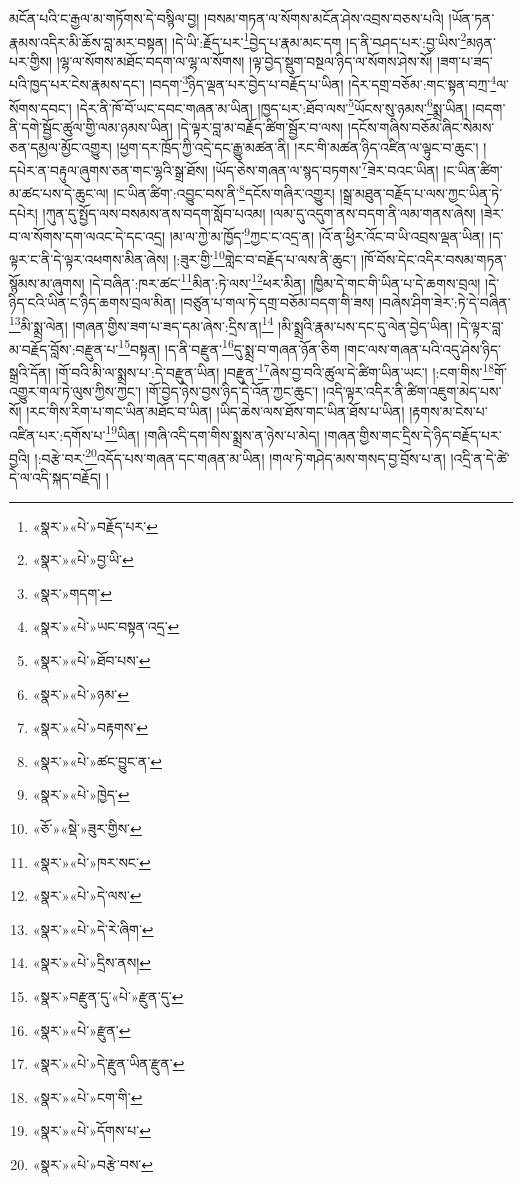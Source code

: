 མངོན་པའི་ང་རྒྱལ་མ་གཏོགས་དེ་བསྙིལ་བྱ། །བསམ་གཏན་ལ་སོགས་མངོན་ཤེས་འབྲས་བཅས་པའི། །ཡོན་ཏན་རྣམས་འདིར་མི་ཆོས་བླ་མར་བསྟན། །དེ་ཡི་:རྗོད་པར་\footnote{«སྣར་»«པེ་»བརྗོད་པར་}བྱེད་པ་རྣམ་མང་དག །ད་ནི་བཤད་པར་:བྱ་ཡིས་\footnote{«སྣར་»«པེ་»བྱ་ཡི་}མཉན་པར་གྱིས། །ལྷ་ལ་སོགས་མཐོང་བདག་ལ་ལྷ་ལ་སོགས། །ལྟ་བྱེད་སྡུག་བསྔལ་ཉིད་ལ་སོགས་ཤེས་སོ། །ཟག་པ་ཟད་པའི་ཁྱད་པར་ངེས་རྣམས་དང་། །བདག་\footnote{«སྣར་»གདག་}ཉིད་ལྡན་པར་བྱེད་པ་བརྗོད་པ་ཡིན། །དེར་དགྲ་བཅོམ་:གང་སྟན་བཀྲ་\footnote{«སྣར་»«པེ་»ཡང་བསྟན་འདྲ་}ལ་སོགས་དབང་། །དེར་ནི་ཁོ་བོ་ཡང་དབང་གཞན་མ་ཡིན། །ཁྱད་པར་:ཐོབ་ལས་\footnote{«སྣར་»«པེ་»ཐོབ་པས་}ཡོངས་སུ་ཉམས་\footnote{«སྣར་»«པེ་»ཉམ་}སྨྲ་ཡིན། །བདག་ནི་དགེ་སྦྱོང་ཚུལ་གྱི་ལམ་ཉམས་ཡིན། །དེ་ལྟར་བླ་མ་བརྗོད་ཚིག་སྦྱོར་བ་ལས། །དངོས་གཞིས་བཅོམ་ཞིང་སེམས་ཅན་དམྱལ་མྱོང་འགྱུར། །ཕྱག་དར་ཁྲོད་ཀྱི་འདྲེ་དང་རྒྱུ་མཚན་ནི། །རང་གི་མཚན་ཉིད་འཛིན་ལ་ལྟུང་བ་ཆུང་། །དཔེར་ན་བརྟུལ་ཞུགས་ཅན་གང་ལྷའི་སྒྲ་ཐོས། །ཡོད་ཅེས་གཞན་ལ་སྙད་བཏགས་\footnote{«སྣར་»«པེ་»བརྟགས་}ཟེར་བའང་ཡིན། །ང་ཡིན་ཚིག་མ་ཚང་པས་དེ་ཆུང་ལ། །ང་ཡིན་ཚིག་:འབྱུང་བས་ནི་\footnote{«སྣར་»«པེ་»ཚང་བྱུང་ན་}དངོས་གཞིར་འགྱུར། །སྒྲ་མཐུན་བརྗོད་པ་ལས་ཀྱང་ཡིན་ཏེ་དཔེར། །ཀུན་དུ་སྤྱོད་ལས་བསམས་ནས་བདག་སློབ་པའམ། །ལམ་དུ་འདུག་ནས་བདག་ནི་ལམ་གནས་ཞེས། །ཟེར་བ་ལ་སོགས་དག་ལའང་དེ་དང་འདྲ། །མ་ལ་ཀྱེ་མ་ཁྱོད་\footnote{«སྣར་»«པེ་»ཁྱེད་}ཀྱང་ང་འདྲ་ན། །འོ་ན་ཕྱིར་འོང་བ་ཡི་འབྲས་ལྡན་ཡིན། །ད་ལྟར་ང་ནི་དེ་ལྟར་འཕགས་མིན་ཞེས། །:ཟུར་གྱི་\footnote{«ཅོ་»«སྡེ་»ཟུར་གྱིས་}གླེང་བ་བརྗོད་པ་ལས་ནི་ཆུང་། །ཁོ་བོས་དེང་འདིར་བསམ་གཏན་སྙོམས་མ་ཞུགས། །དེ་བཞིན་:ཁར་ཚང་\footnote{«སྣར་»«པེ་»ཁར་སང་}མིན་:ཏེ་ལས་\footnote{«སྣར་»«པེ་»དེ་ལས་}ཕར་མིན། །ཁྱིམ་དེ་གང་གི་ཡིན་པ་དེ་ཆགས་བྲལ། །དེ་ཉིད་ངའི་ཡིན་ང་ཉིད་ཆགས་བྲལ་མིན། །བཙུན་པ་གལ་ཏེ་དགྲ་བཅོམ་བདག་གི་ཟས། །བཞེས་ཤིག་ཟེར་:ཏེ་དེ་བཞིན་\footnote{«སྣར་»«པེ་»དེ་རེ་ཞིག་}མི་སྨྲ་ལེན། །གཞན་གྱིས་ཟག་པ་ཟད་དམ་ཞེས་:དྲིས་ན།\footnote{«སྣར་»«པེ་»དྲིས་ནས།} །མི་སྨྲའི་རྣམ་པས་དང་དུ་ལེན་བྱེད་ཡིན། །དེ་ལྟར་བླ་མ་བརྗོད་བློས་:བརྫུན་པ་\footnote{«སྣར་»བརྫུན་དུ་«པེ་»རྫུན་དུ་}བསྟན། །ད་ནི་བརྫུན་\footnote{«སྣར་»«པེ་»རྫུན་}དུ་སྨྲ་བ་གཞན་ཉོན་ཅིག །གང་ལས་གཞན་པའི་འདུ་ཤེས་ཉིད་སྒྲའི་དོན། །གོ་བའི་མི་ལ་སྨྲས་པ་:དེ་བརྫུན་ཡིན། །བརྫུན་\footnote{«སྣར་»«པེ་»དེ་རྫུན་ཡིན་རྫུན་}ཞེས་བྱ་བའི་ཚུལ་དེ་ཚིག་ཡིན་ཡང་། །:ངག་གིས་\footnote{«སྣར་»«པེ་»ངག་གི་}གོ་འགྱུར་གལ་ཏེ་ལུས་ཀྱིས་ཀྱང་། །གོ་བྱེད་ཉེས་བྱས་ཉིད་དེ་འོན་ཀྱང་ཆུང་། །འདི་ལྟར་འདིར་ནི་ཚིག་འཇུག་མེད་པས་སོ། །རང་གིས་རིག་པ་གང་ཡིན་མཐོང་བ་ཡིན། །ཡིད་ཆེས་ལས་ཐོས་གང་ཡིན་ཐོས་པ་ཡིན། །རྟགས་མ་ངེས་པ་འཛིན་པར་:དགོས་པ་\footnote{«སྣར་»«པེ་»དོགས་པ་}ཡིན། །གཞི་འདི་དག་གིས་སྨྲས་ན་ཉེས་པ་མེད། །གཞན་གྱིས་གང་དྲིས་དེ་ཉིད་བརྗོད་པར་བྱའི། །:བརྩེ་བར་\footnote{«སྣར་»«པེ་»བརྩེ་བས་}འདོད་པས་གཞན་དང་གཞན་མ་ཡིན། །གལ་ཏེ་གཤེད་མས་གསད་བྱ་བྲོས་པ་ན། །འདྲི་ན་དེ་ཚེ་དེ་ལ་འདི་སྐད་བརྗོད། །

